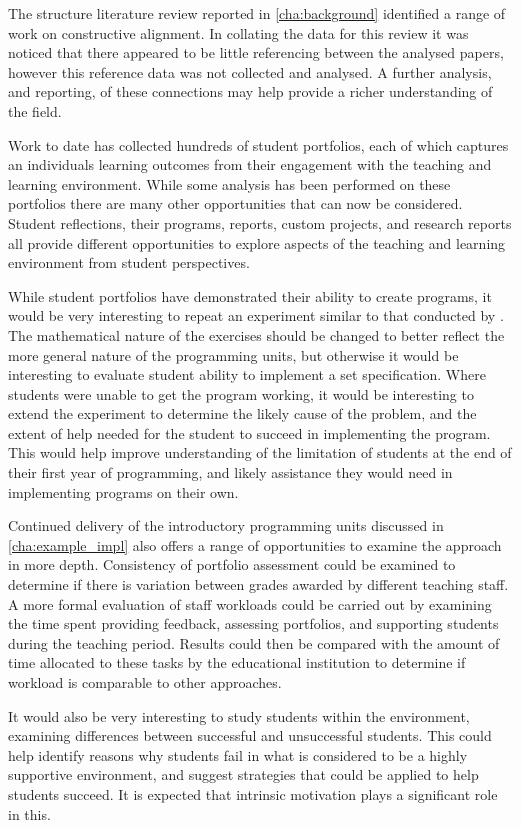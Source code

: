 The structure literature review reported in \cref{cha:background} identified a range of work on constructive alignment. In collating the data for this review it was noticed that there appeared to be little referencing between the analysed papers, however this reference data was not collected and analysed. A further analysis, and reporting, of these connections may help provide a richer understanding of the field.

Work to date has collected hundreds of student portfolios, each of which captures an individuals learning outcomes from their engagement with the teaching and learning environment. While some analysis has been performed on these portfolios there are many other opportunities that can now be considered. Student reflections, their programs, reports, custom projects, and research reports all provide different opportunities to explore aspects of the teaching and learning environment from student perspectives.

While student portfolios have demonstrated their ability to create programs, it would be very interesting to repeat an experiment similar to that conducted by \citet{McCracken:2001}. The mathematical nature of the exercises should be changed to better reflect the more general nature of the programming units, but otherwise it would be interesting to evaluate student ability to implement a set specification. Where students were unable to get the program working, it would be interesting to extend the experiment to determine the likely cause of the problem, and the extent of help needed for the student to succeed in implementing the program. This would help improve understanding of the limitation of students at the end of their first year of programming, and likely assistance they would need in implementing programs on their own. 

Continued delivery of the introductory programming units discussed in \cref{cha:example_impl} also offers a range of opportunities to examine the approach in more depth. Consistency of portfolio assessment could be examined to determine if there is variation between grades awarded by different teaching staff. A more formal evaluation of staff workloads could be carried out by examining the time spent providing feedback, assessing portfolios, and supporting students during the teaching period. Results could then be compared with the amount of time allocated to these tasks by the educational institution to determine if workload is comparable to other approaches.

It would also be very interesting to study students within the environment, examining differences between successful and unsuccessful students. This could help identify reasons why students fail in what is considered to be a highly supportive environment, and suggest strategies that could be applied to help students succeed. It is expected that intrinsic motivation plays a significant role in this.

